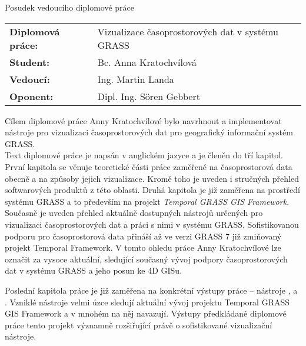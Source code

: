 \documentclass[czech,11pt,a4paper]{article}
\begin{document}
\begin{center}
  {\Large Posudek vedoucího diplomové práce}
\end{center}

\vspace{.5cm}

\noindent \begin{tabular}{lp{}}
  {\bf Diplomová práce:} &
  Vizualizace časoprostorových dat v systému GRASS \\
  {\bf Student:} & Bc. Anna Kratochvílová \\
  {\bf Vedoucí:} & Ing. Martin Landa \\
  {\bf Oponent:} & Dipl. Ing. S\"oren Gebbert \\
\end{tabular}

\vspace{1cm}

Cílem diplomové práce Anny Kratochvílové bylo navrhnout a
implementovat nástroje pro vizualizaci časoprostorových dat
pro geografický informační systém GRASS. \\

Text diplomové práce je napsán v anglickém jazyce a je členěn do tří
kapitol. První kapitola se věnuje teoretické části práce zaměřené na
časoprostorová data obecně a na způsoby jejich vizualizace. Kromě toho
je uveden i stručných přehled softwarových produktů z této
oblasti. Druhá kapitola je již zaměřena na prostředí systému GRASS a
to především na projekt {\em Temporal GRASS GIS Framework}. Současně
je uveden přehled aktuálně dostupných nástrojů určených pro
vizualizaci časoprostorových dat a práci s nimi v systému
GRASS. Sofistikovanou podporu pro časoprostorová data přináší až ve
verzi GRASS 7 již zmiňovaný projekt Temporal Framework. V tomto ohledu
práce Anny Kratochvílové lze označit za vysoce aktuální, sledující
současný vývoj podpory časoprostorových dat v systému GRASS a jeho
posun ke 4D GISu.

Poslední kapitola práce je již zaměřena na konkrétní výstupy práce --
nástroje ,  a . Vzniklé nástroje velmi úzce sledují aktuální vývoj projektu
Temporal GRASS GIS Framework a v mnohém na něj navazují. Výstupy
předkládané diplomové práce tento projekt významně rozšiřující právě o
sofistikované vizualizační nástroje. \\
\end{document}
